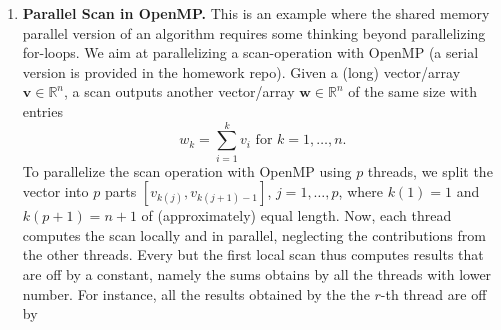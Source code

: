 \documentclass[12pt]{article}
\newcommand{\bs}{\boldsymbol}
\begin{document}
\begin{enumerate}
\begin{verbatim}
  Vec4 s = x1;
  s += x3  * c3 ;
  s += x5  * c5 ;
  s += x7  * c7;
  s += x9  * c9;
  s += x11 * c11;
  s.StoreAligned(sinx);
}
\end{verbatim}
Here are the results
\begin{verbatim}
PS C:\Users\zixiao\HPC\HPC-hw3> .\fast-sin.exe
Reference time: 0.0388
Taylor time:    1.4339      Error: 1.402833e+43
Intrin time:    0.0021      Error: 1.402833e+43
Vector time:    0.0020      Error: 1.402833e+43
\end{verbatim}
The intrinic and vectorized methods are far faster than the Tylor implement. Both achieve 12-digits accuracy because they have the same error as the referrence method with 12-digits accuracy.
\\
\\
{\bf Extra Credits}
\\
Observe that $sin(x+\pi)=-sin(x)$. Hence, we can force $x$ to be in the interval $[-\pi/4, 3\pi/4)$ by subtracting $pi$ continuously.
\\
If $x\in [-\pi/4,\pi/4]$, then we calculate $x$ the same way we proceed before. If $x\in (\pi/4, 3pi/4)$, then we use the formula $sin(x+\pi/2)=-cos(x)$ to calculate for $cos(x)$ instead. We use the following formula to compute $cos(x)$ for 12-digits accuracy.
\[
cos(x) = 1-\frac{x^2}{2!}+\frac{x^4}{4!}-\frac{x^6}{6!}+\frac{x^8}{8!}-\frac{x^{10}}{10!}+\frac{x^{12}}{12!}
\]
However, this part is not implemented successfully.
\newpage
  \item {\bf Parallel Scan in OpenMP.} This is an example where the
    shared memory parallel version of an algorithm requires some
    thinking beyond parallelizing for-loops. We aim at parallelizing a
    scan-operation with OpenMP (a serial version is provided in the
    homework repo). Given a (long) vector/array $\bs v\in \mathbb
    R^n$, a scan outputs another vector/array $\bs w\in \mathbb R^n$ of
    the same size with entries
    $$
    w_k = \sum_{i=1}^k v_i \text{ for } k=1,\ldots,n.
    $$
    To parallelize the scan operation with OpenMP using $p$ threads,
    we split the vector into $p$ parts $[v_{k(j)},v_{k(j+1)-1}]$,
    $j=1,\ldots,p$, where $k(1)=1$ and $k(p+1)=n+1$ of (approximately)
    equal length. Now, each thread computes the scan locally and in
    parallel, neglecting the contributions from the other threads.
    Every but the first local scan thus computes results that are off
    by a constant, namely the sums obtains by all the threads with
    lower number.  For instance, all the results obtained by the
    the $r$-th thread are off by

\end{enumerate}
\end{document}
